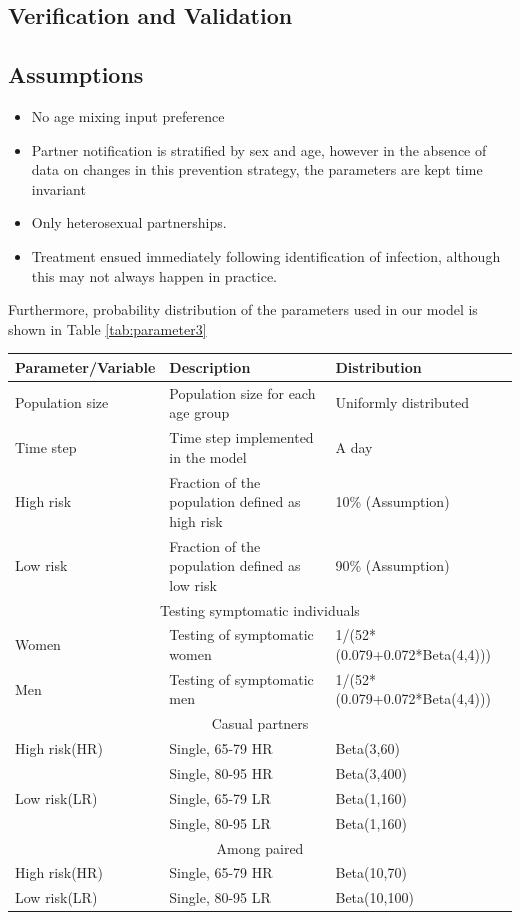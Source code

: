 \documentclass{article}
\begin{document}
\begin{normalsize}
\section{Verification and Validation}
\subsection{Assumptions}
\begin{itemize}
	\item No age mixing input preference
	\item Partner notification is stratified by sex and age, however in the absence of data on changes in this prevention strategy, the parameters are kept time invariant
	\item Only heterosexual partnerships.
	\item Treatment ensued immediately following identification of infection, although this may not always happen in practice.
\end{itemize}
Furthermore, probability distribution of the parameters used in our model is shown in Table \ref{tab:parameter3}\\
	\begin{table}[H]
	\centering
	\begin{tabular}{ |p{5cm}|p{7cm}|p{5cm}| } 
		\hline
		Parameter/Variable & Description & Distribution  \\ 
		\hline
		Population size & Population size for each age group & Uniformly distributed\\
		Time step &	Time step implemented in the model & 	A day \\
		High risk & Fraction of the population defined as high risk	& 10\% (Assumption) \\
		Low risk & Fraction of the population defined as low risk & 90\% (Assumption)\\
		\hline
		\multicolumn{3}{|c|}{Testing symptomatic individuals} \\
		\hline
		Women &	Testing of symptomatic  women	& 1/(52*(0.079+0.072*Beta(4,4)))\\
		Men	& Testing of symptomatic men	& 1/(52*(0.079+0.072*Beta(4,4)))\\
		\hline
		
		\multicolumn{3}{|c|}{Casual partners} \\
		\hline
		High risk(HR)& Single, 65-79 HR	& Beta(3,60)\\
		& Single, 80-95 HR	& Beta(3,400)\\
		Low risk(LR)	 & Single, 65-79 LR	& Beta(1,160) \\
		& Single, 80-95 LR	&Beta(1,160)\\
		\hline
		\multicolumn{3}{|c|}{Among paired} \\
		\hline
		High risk(HR)& Single, 65-79 HR	& Beta(10,70)\\
		Low risk(LR) & Single, 80-95 LR	& Beta(10,100)\\
		\hline
		

\end{tabular}
\end{table}
\end{normalsize}
\end{document}
